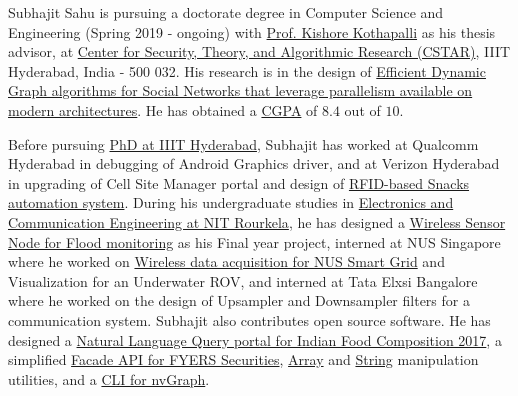Subhajit Sahu is pursuing a doctorate degree in Computer Science and Engineering (Spring 2019 - ongoing) with \href{https://faculty.iiit.ac.in/~kkishore/}{Prof. Kishore Kothapalli} as his thesis advisor, at \href{https://cstar.iiit.ac.in}{Center for Security, Theory, and Algorithmic Research (CSTAR)}, IIIT Hyderabad, India - 500 032. His research is in the design of \href{https://scholar.google.com/citations?user=rfOetTIAAAAJ&hl=en}{Efficient Dynamic Graph algorithms for Social Networks that leverage parallelism available on modern architectures}. He has obtained a \href{https://drive.google.com/file/d/1c9goUgwXkyhsWIOc873RDhTk7nEs-hJ5/view?usp=sharing}{CGPA} of $8.4$ out of $10$.

\vspace{-3ex}
Before pursuing \href{https://iiithf.github.io}{PhD at IIIT Hyderabad}, Subhajit has worked at Qualcomm Hyderabad in debugging of Android Graphics driver, and at Verizon Hyderabad in upgrading of Cell Site Manager portal and design of \href{https://github.com/raspberrypif/rfid}{RFID-based Snacks automation system}. During his undergraduate studies in \href{https://nitrece.github.io}{Electronics and Communication Engineering at NIT Rourkela}, he has designed a \href{https://github.com/nitrece/flood-monitoring}{Wireless Sensor Node for Flood monitoring} as his Final year project, interned at NUS Singapore where he worked on \href{https://github.com/nitrece/smart-grid-monitoring}{Wireless data acquisition for NUS Smart Grid} and Visualization for an Underwater ROV, and interned at Tata Elxsi Bangalore where he worked on the design of Upsampler and Downsampler filters for a communication system. Subhajit also contributes open source software. He has designed a \href{https://github.com/ifct2017/ifct2017}{Natural Language Query portal for Indian Food Composition 2017}, a simplified \href{https://github.com/nodef/extra-fyers}{Facade API for FYERS Securities}, \href{https://github.com/nodef/extra-array}{Array} and \href{https://github.com/nodef/extra-string}{String} manipulation utilities, and a \href{https://github.com/nodef/nvgraph.sh}{CLI for nvGraph}.
